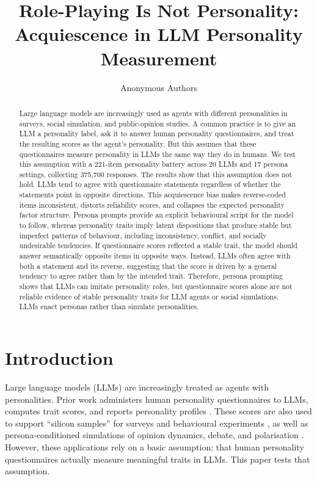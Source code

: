 \documentclass[11pt]{article}
\title{Role-Playing Is Not Personality:\\ Acquiescence in LLM Personality Measurement}
\author{Anonymous Authors}
\date{}
\begin{document}
\maketitle

\begin{abstract}
Large language models are increasingly used as agents with different personalities in surveys, social simulation, and public-opinion studies. A common practice is to give an LLM a personality label, ask it to answer human personality questionnaires, and treat the resulting scores as the agent's personality. But this assumes that these questionnaires measure personality in LLMs the same way they do in humans. We test this assumption with a 221-item personality battery across 20 LLMs and 17 persona settings, collecting 375,700 responses. The results show that this assumption does not hold. LLMs tend to agree with questionnaire statements regardless of whether the statements point in opposite directions. This acquiescence bias makes reverse-coded items inconsistent, distorts reliability scores, and collapses the expected personality factor structure. Persona prompts provide an explicit behavioural script for the model to follow, whereas personality traits imply latent dispositions that produce stable but imperfect patterns of behaviour, including inconsistency, conflict, and socially undesirable tendencies. If questionnaire scores reflected a stable trait, the model should answer semantically opposite items in opposite ways. Instead, LLMs often agree with both a statement and its reverse, suggesting that the score is driven by a general tendency to agree rather than by the intended trait. Therefore, persona prompting shows that LLMs can imitate personality roles, but questionnaire scores alone are not reliable evidence of stable personality traits for LLM agents or social simulations. LLMs enact personas rather than simulate personalities.
\end{abstract}

\section{Introduction}

Large language models (LLMs) are increasingly treated as agents with personalities. Prior work administers human personality questionnaires to LLMs, computes trait scores, and reports personality profiles \citep{miotto2023gpt3, bhandari2025evaluating, serapio2025psychometric, sorokovikova2024evaluating, lee2025trait, jiang2023personallm, huang2023psychobench}. These scores are also used to support ``silicon samples'' for surveys and behavioural experiments \citep{argyle2023one, horton2023homo, aher2023using, park2023generative, ferreira2025matching}, as well as persona-conditioned simulations of opinion dynamics, debate, and polarisation \citep{chuang2023simulating, cau2025language, chuang2025debate}. However, these applications rely on a basic assumption: that human personality questionnaires actually measure meaningful traits in LLMs. This paper tests that assumption.
\end{document}
